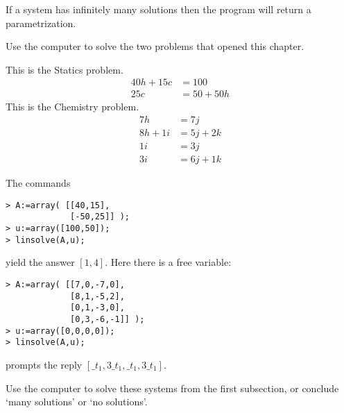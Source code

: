 If a system has infinitely many solutions then 
the program will return a parametrization.


\begin{exercises}
  \item 
    Use the computer to solve the two problems that opened this
    chapter.
    \begin{exparts}
      \partsitem This is the Statics problem.
         \begin{align*}
            40h+15c  &= 100  \\
            25c      &= 50+50h
         \end{align*}
      \partsitem This is the Chemistry problem.
         \begin{align*} 
             7h      &= 7j  \\
             8h +1i  &= 5j+2k  \\
             1i      &= 3j  \\
             3i      &= 6j+1k
         \end{align*}
    \end{exparts}
    \begin{answer}
      \begin{exparts}
        \partsitem The commands
\begin{indented}{\small
\begin{verbatim}
> A:=array( [[40,15],
             [-50,25]] );
> u:=array([100,50]);
> linsolve(A,u);
\end{verbatim}
}\end{indented}
           yield the answer $[1,4]$.
        \partsitem Here there is a free variable:
\begin{indented}{\small
\begin{verbatim}
> A:=array( [[7,0,-7,0],
             [8,1,-5,2],
             [0,1,-3,0],
             [0,3,-6,-1]] );
> u:=array([0,0,0,0]);
> linsolve(A,u);
\end{verbatim}
}\end{indented}
         prompts the reply $[\_t_1,3\_t_1,\_t_1,3\_t_1]$.
      \end{exparts}
    \end{answer}
\item 
    Use the computer to solve these systems from the
    first subsection,
    or conclude `many solutions' or `no solutions'.
\end{exercises}
